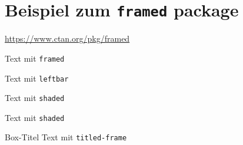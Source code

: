 \documentclass[DIV=13]{scrartcl}
\begin{document}
\section*{Beispiel zum \texttt{framed} package}

\url{https://www.ctan.org/pkg/framed}

\begin{framed}
Text mit \texttt{framed}
\end{framed}

\begin{leftbar}
Text mit \texttt{leftbar}
\end{leftbar}

\begin{shaded}
Text mit \texttt{shaded}
\end{shaded}


\begin{shaded}
Text mit \texttt{shaded}
\end{shaded}

\begin{titled-frame}{Box-Titel}
Text mit \texttt{titled-frame}
\end{titled-frame}
\end{document}
